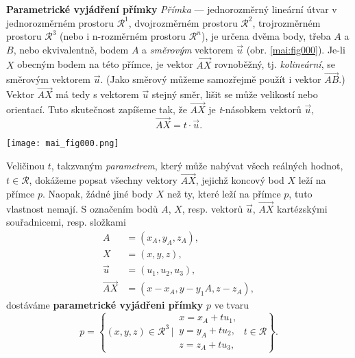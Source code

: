 
\begin{example}\label{mai:exam001}
  \textbf{Parametrické vyjádření přímky}\newline
  \emph{Přímka} — jednorozměrný lineární útvar v jednorozměrném prostoru \(\mathcal{R}^1\), 
  dvojrozměrném prostoru \(\mathcal{R}^2\), trojrozměrném prostoru \(\mathcal{R}^3\) (nebo i 
  n-rozměrném prostoru \(\mathcal{R}^n\)), je určena dvěma body, třeba \(A\) a \(B\), nebo
  ekvivalentně, bodem \(A\) a \emph{směrovým} vektorem \(\vec{u}\) (obr. \ref{mai:fig000}). 
  Je-li \(X\) obecným bodem na této přímce, je vektor \(\overrightarrow{AX}\) rovnoběžný, tj. 
  \emph{kolineární}, se směrovým vektorem \(\vec{u}\). (Jako směrový můžeme samozřejmě 
  použít i vektor \(\overrightarrow{AB}\).) Vektor \(\overrightarrow{AX}\) má tedy s vektorem 
  \(\vec{u}\) stejný směr, lišit se může velikostí nebo orientací. Tuto skutečnost zapíšeme 
  tak, že \(\overrightarrow{AX}\) je \emph{t}-násobkem vektorů \(\vec{u}\),
  \begin{equation*}
  \overrightarrow{AX} = t \cdot \vec{u}.
  \end{equation*}
  {\centering
    \captionsetup{type=figure}
    \texttt{[image: mai\_fig000.png]}
    \par}        
  Veličinou \(t\), takzvaným \emph{parametrem}, který může nabývat všech reálných hodnot, 
  \(t\in\mathcal{R}\), dokážeme popsat všechny vektory \(\overrightarrow{AX}\), jejichž 
  koncový bod \(X\) leží na přímce \(p\). Naopak, žádné jiné body \(X\) než ty, které leží na 
  přímce \(p\), tuto vlastnost nemají. S označením bodů \(A\), \(X\), resp. vektorů 
  \(\vec{u}\), \(\overrightarrow{AX}\) kartézskými souřadnicemi, resp. složkami
  \begin{align*}
                    A &= (x_A,y_A, z_A), \\ 
                    X &=(x,y,z),         \\
              \vec{u} &= (u_1,u_2,u_3),  \\ 
  \overrightarrow{AX} &= (x - x_A, y - y_1A, z-z_A),
  \end{align*}
  dostáváme \textbf{parametrické vyjádřeni přímky} \(p\) ve tvaru
  \begin{equation}
    p = \left\{(x,y,z)\in\mathcal{R}^3\,|\,
    \begin{matrix}
      x = x_A + tu_1,        \\
      y = y_A + tu_2,        \\
     z = z_A + tu_3,
    \end{matrix}
    \;t\in\mathcal{R}
    \right\}. \label{MAI:eq_M001}
  \end{equation}
\end{example}
\normalsize